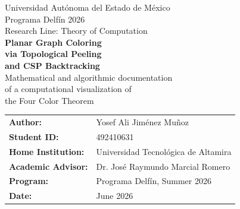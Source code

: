 \documentclass[12pt,letterpaper]{article}
\theoremstyle{plain}
\theoremstyle{definition}
\theoremstyle{remark}
\begin{document}

\begin{titlepage}
\centering
\vspace*{2cm}

{\large Universidad Aut\'onoma del Estado de M\'exico}\\[0.3cm]
{\large Programa Delf\'in 2026}\\[0.3cm]
{\large Research Line: Theory of Computation}\\[2cm]

{\LARGE\bfseries Planar Graph Coloring}\\[0.4cm]
{\LARGE\bfseries via Topological Peeling}\\[0.4cm]
{\LARGE\bfseries and CSP Backtracking}\\[0.8cm]

{\large Mathematical and algorithmic documentation\\
of a computational visualization of\\
the Four Color Theorem}\\[2.5cm]

\begin{tabular}{ll}
\textbf{Author:}              & Yosef Ali Jim\'enez Mu\~noz \\
\textbf{Student ID:}          & 492410631 \\
\textbf{Home Institution:}    & Universidad Tecnol\'ogica de Altamira \\
\textbf{Academic Advisor:}    & Dr. Jos\'e Raymundo Marcial Romero \\
\textbf{Program:}             & Programa Delf\'in, Summer 2026 \\
\textbf{Date:}                & June 2026
\end{tabular}

\vfill
\end{titlepage}
\end{document}
